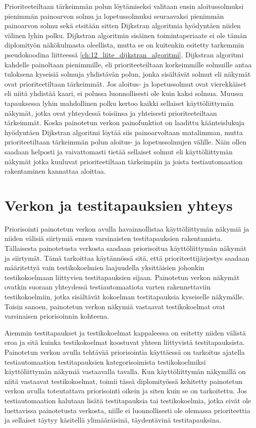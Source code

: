   Prioriteeteiltaan tärkeimmän polun löytämiseksi valitaan ensin aloitussolmuksi pienimmän painoarvon solmu ja lopetussolmuksi seuraavaksi pienimmän painoarvon solmu sekä etsitään sitten Dijkstran algoritmia hyödyntäen niiden välinen lyhin polku.
  Dijkstran algoritmin sisäinen toimintaperiaate ei ole tämän diplomityön näkökulmasta oleellista, mutta se on kuitenkin esitetty tarkemmin pseudokoodina liitteessä \ref{ch:12_liite_dijkstran_algoritmi}.
  Dijkstran algoritmi kahdelle painoltaan pienimmille, eli prioriteeteiltaan korkeimmille solmuille antaa tuloksena kyseisiä solmuja yhdistävän polun, jonka sisältävät solmut eli näkymät ovat prioriteetiltaan tärkeimmät.
  Jos aloitus- ja lopetussolmut ovat vierekkäiset eli niitä yhdistää kaari, ei polussa luonnollisesti ole kuin kaksi solmua.
  Muussa tapauksessa lyhin mahdollinen polku kertoo kaikki sellaiset käyttöliittymän näkymät, jotka ovat yhteydessä toisiinsa ja yhteisesti prioriteeteiltaan tärkeimmät.
  Koska painotetun verkon painofunktiot on laadittu käänteislukuja hyödyntäen Dijkstran algoritmi löytää siis painoarvoltaan matalimman, mutta prioriteetiltaan tärkeimmän polun aloitus- ja lopetussolmujen välille.
  Näin ollen saadaan helposti ja vaivattomasti tietää sellaiset solmut eli käyttöliittymän näkymät jotka kuuluvat prioriteetiltaan tärkeimpiin ja joista testiautomaation rakentaminen kannattaa aloittaa.

\section{Verkon ja testitapauksien yhteys} \label{ch:10_verkon_ja_testitapauksien_yhteys}

  Priorisointi painotetun verkon avulla havainnollistaa käyttöliittymän näkymiä ja niiden välisiä siirtymiä ennen varsinaisten testitapauksien rakentamista.
  Tällaisesta painotetusta verkosta saadaan priorisoitua käyttöliittymän näkymät ja siirtymät.
  Tämä tarkoittaa käytännössä sitä, että prioriteettijärjestys saadaan määritettyä vain testikokoelmien laajuudella yksittäisien johonkin testikokoelmaan liittyvien testitapauksien sijaan.
  Painotetun verkon näkymät ovatkin suoraan yhteydessä testiautomaatiota varten rakennettaviin testikokoelmiin, jotka sisältävät kokoelman testitapauksia kyseiselle näkymälle.
  Toisin sanoen, painotetun verkon näkymiä vastaavat testikokoelmat ovat varsinaisen priorisoinnin kohteena.

  Aiemmin testitapaukset ja testikokoelmat kappaleessa on esitetty niiden välistä eroa ja sitä kuinka testikokoelmat koostuvat yhteen liittyvistä testitapauksista.
  Painotetun verkon avulla tehtävää priorisointia käyttäessä on tarkoitus ajatella testiautomaation testitapauksien kategorisoimista testikokoelmiksi käyttöliittymän näkymiä vastaavalla tavalla.
  Kun käyttöliittymän näkymillä on niitä vastaavat testikokoelmat, toimii tässä diplomityössä kehitetty painotetun verkon avulla toteutattava priorisointi oikein ja siten kuin se on tarkoitettu.
  Jos testiautomaation halutaan lisätä testitapauksia tai testikokoelmia, jotka eivät ole luettavissa painotetusta verkosta, niille ei luonnollisesti ole olemassa prioriteettia ja sellaiset täytyy käsitellä ylimääräisinä, täydentävinä testitapauksina.

